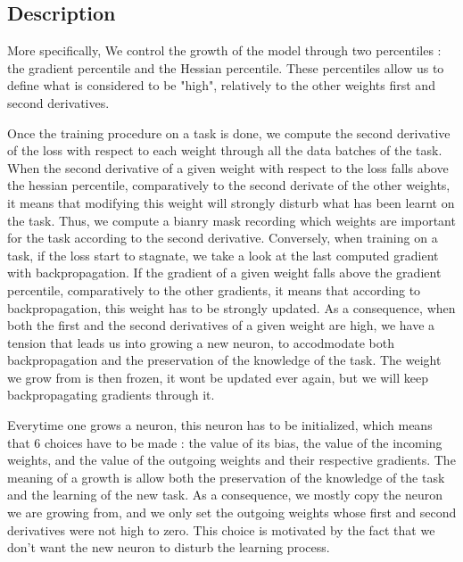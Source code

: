 \documentclass[twocolumn]{article}
\begin{document}
\subsection{Description}


More specifically, We control the growth of the model through two percentiles : the gradient percentile and the Hessian percentile. These percentiles allow us to define what is considered to be "high", relatively to the other weights first and second derivatives.

\vspace{2mm}
\noindent
Once the training procedure on a task is done, we compute the second derivative of the loss with respect to each weight through all the data batches of the task. When the second derivative of a given weight with respect to the loss falls above the hessian percentile, comparatively to the second derivate of the other weights, it means that modifying this weight will strongly disturb what has been learnt on the task. Thus, we compute a bianry mask recording which weights are important for the task according to the second derivative. Conversely, when training on a task, if the loss start to stagnate, we take a look at the last computed gradient with backpropagation. If the gradient of a given weight falls above the gradient percentile, comparatively to the other gradients, it means that according to backpropagation, this weight has to be strongly updated. As a consequence, when both the first and the second derivatives of a given weight are high, we have a tension that leads us into growing a new neuron, to accodmodate both backpropagation and the preservation of the knowledge of the task. The weight we grow from is then frozen, it wont be updated ever again, but we will keep backpropagating gradients through it. 

\vspace{2mm}
\noindent
Everytime one grows a neuron, this neuron has to be initialized, which means that 6 choices have to be made : the value of its bias, the value of the incoming weights, and the value of the outgoing weights and their respective gradients. The meaning of a growth is allow both the preservation of the knowledge of the task and the learning of the new task. As a consequence, we mostly copy the neuron we are growing from, and we only set the outgoing weights whose first and second derivatives were not high to zero. This choice is motivated by the fact that we don't want the new neuron to disturb the learning process.
\end{document}
